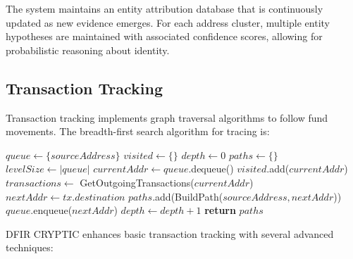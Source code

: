 \documentclass[conference]{IEEEtran}
\begin{document}
The system maintains an entity attribution database that is continuously updated as new evidence emerges. For each address cluster, multiple entity hypotheses are maintained with associated confidence scores, allowing for probabilistic reasoning about identity.

\subsection{Transaction Tracking}

Transaction tracking implements graph traversal algorithms to follow fund movements. The breadth-first search algorithm for tracing is:

\begin{algorithm}
\caption{Transaction Tracking BFS}
\begin{algorithmic}[1]
\State $queue \gets \{sourceAddress\}$
\State $visited \gets \{\}$
\State $depth \gets 0$
\State $paths \gets \{\}$
    \State $levelSize \gets |queue|$
        \State $currentAddr \gets queue$.dequeue()
        \State $visited$.add($currentAddr$)
        \State $transactions \gets$ GetOutgoingTransactions($currentAddr$)
                \State $nextAddr \gets tx.destination$
                    \State $paths$.add(BuildPath($sourceAddress, nextAddr$))
                    \State $queue$.enqueue($nextAddr$)
                \EndIf
            \EndIf
        \EndFor
    \EndFor
    \State $depth \gets depth + 1$
\EndWhile
\State \textbf{return} $paths$
\EndProcedure
\end{algorithmic}
\end{algorithm}

DFIR CRYPTIC enhances basic transaction tracking with several advanced techniques:
\end{document}
